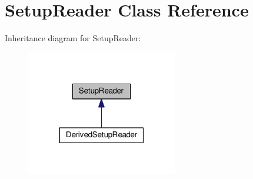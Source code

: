 \hypertarget{classSetupReader}{}\section{Setup\+Reader Class Reference}
\label{classSetupReader}


Inheritance diagram for Setup\+Reader\+:
\nopagebreak
\begin{figure}[H]
\begin{center}
\leavevmode
\includegraphics[width=187pt]{classSetupReader__inherit__graph}
\end{center}
\end{figure}
